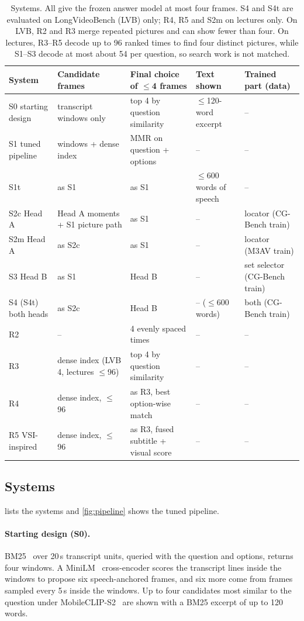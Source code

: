 \begin{table}[t]
\centering
\small
\setlength{\tabcolsep}{4pt}
\begin{tabularx}{\textwidth}{@{}lXXll@{}}
\toprule
System & Candidate frames & Final choice of $\le$4 frames & Text shown & Trained part (data) \\
\midrule
S0 starting design & transcript windows only & top 4 by question similarity & $\le$120-word excerpt & -- \\
S1 tuned pipeline & windows + dense index & MMR on question + options & -- & -- \\
S1t & as S1 & as S1 & $\le$600 words of speech & -- \\
S2c Head A & Head A moments + S1 picture path & as S1 & -- & locator (CG-Bench train) \\
S2m Head A & as S2c & as S1 & -- & locator (M3AV train) \\
S3 Head B & as S1 & Head B & -- & set selector (CG-Bench train) \\
S4 (S4t) both heads & as S2c & Head B & -- ($\le$600 words) & both (CG-Bench train) \\
\midrule
R2 & -- & 4 evenly spaced times & -- & -- \\
R3 & dense index (LVB 4, lectures $\le$96) & top 4 by question similarity & -- & -- \\
R4 & dense index, $\le$96 & as R3, best option-wise match & -- & -- \\
R5 VSI-inspired & dense index, $\le$96 & as R3, fused subtitle + visual score & -- & -- \\
\bottomrule
\end{tabularx}
\caption{Systems. All give the frozen answer model at most four frames. S4 and S4t are evaluated on LongVideoBench (LVB) only; R4, R5 and S2m on lectures only. On LVB, R2 and R3 merge repeated pictures and can show fewer than four. On lectures, R3--R5 decode up to 96 ranked times to find four distinct pictures, while S1--S3 decode at most about 54 per question, so search work is not matched.}
\label{tab:systems}
\end{table}

\subsection{Systems}
\label{sec:systems}
 lists the systems and \cref{fig:pipeline} shows the tuned pipeline.

\paragraph{Starting design (S0).}
BM25~\cite{robertson2009bm25} over 20\,s transcript units, queried with the question and options, returns four windows.
A MiniLM~\cite{wang2020minilm} cross-encoder scores the transcript lines inside the windows to propose six speech-anchored frames, and six more come from frames sampled every 5\,s inside the windows.
Up to four candidates most similar to the question under MobileCLIP-S2~\cite{vasu2024mobileclip} are shown with a BM25 excerpt of up to 120 words.

